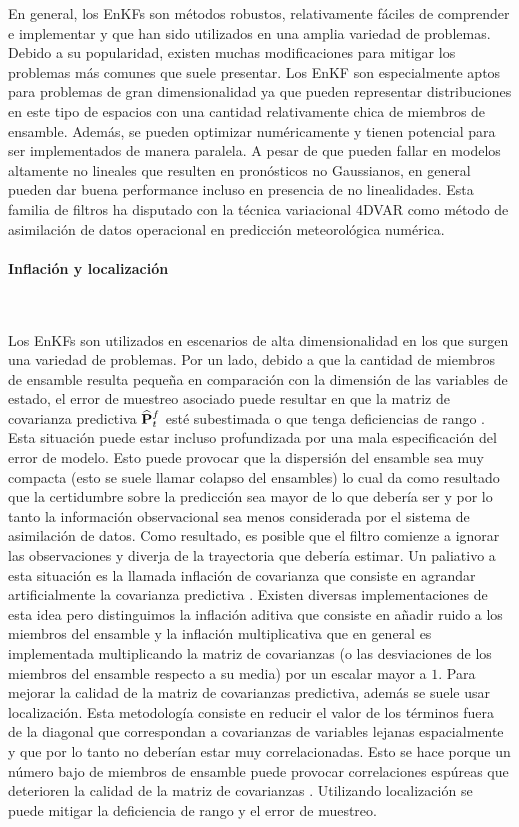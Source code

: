 En general, los EnKFs son métodos robustos, relativamente fáciles de comprender e implementar y que han sido utilizados en una amplia variedad de problemas. Debido a su popularidad, existen muchas modificaciones para mitigar los problemas más comunes que suele presentar. Los EnKF son especialmente aptos para problemas de gran dimensionalidad ya que pueden representar distribuciones en este tipo de espacios con una cantidad relativamente chica de miembros de ensamble. Además, se pueden optimizar numéricamente y tienen potencial para ser implementados de manera paralela. A pesar de que pueden fallar en modelos altamente no lineales que resulten en pronósticos no Gaussianos, en general pueden dar buena performance incluso en presencia de no linealidades. Esta familia de filtros ha disputado con la técnica variacional 4DVAR como método de asimilación de datos operacional en predicción meteorológica numérica.

\paragraph{Inflación y localización} \

Los EnKFs son utilizados en escenarios de alta dimensionalidad en los que surgen una variedad de problemas. Por un lado, debido a que la cantidad de miembros de ensamble resulta pequeña en comparación con la dimensión de las variables de estado, el error de muestreo asociado puede resultar en que la matriz de covarianza predictiva $\widehat{\mathbf{P}}_t^f$ esté subestimada o que tenga deficiencias de rango \citep{Miyoshi2011}. Esta situación puede estar incluso profundizada por una mala especificación del error de modelo. Esto puede provocar que la dispersión del ensamble sea muy compacta (esto se suele llamar colapso del ensambles) lo cual da como resultado que la certidumbre sobre la predicción sea mayor de lo que debería ser y por lo tanto la información observacional sea menos considerada por el sistema de asimilación de datos. Como resultado, es posible que el filtro comienze a ignorar las observaciones y diverja de la trayectoria que debería estimar. Un paliativo a esta situación es la llamada inflación de covarianza que consiste en agrandar artificialmente la covarianza predictiva \citep{Anderson1999}. Existen diversas implementaciones de esta idea pero distinguimos la inflación aditiva que consiste en añadir ruido a los miembros del ensamble y la inflación multiplicativa que en general es implementada multiplicando la matriz de covarianzas (o las desviaciones de los miembros del ensamble respecto a su media) por un escalar mayor a $1$. Para mejorar la calidad de la matriz de covarianzas predictiva, además se suele usar localización. Esta metodología consiste en reducir el valor de los términos fuera de la diagonal que correspondan a covarianzas de variables lejanas espacialmente y que por lo tanto no deberían estar muy correlacionadas. Esto se hace porque un número bajo de miembros de ensamble puede provocar correlaciones espúreas que deterioren la calidad de la matriz de covarianzas \citep{Hamill2001}. Utilizando localización se puede mitigar la deficiencia de rango y el error de muestreo. 
